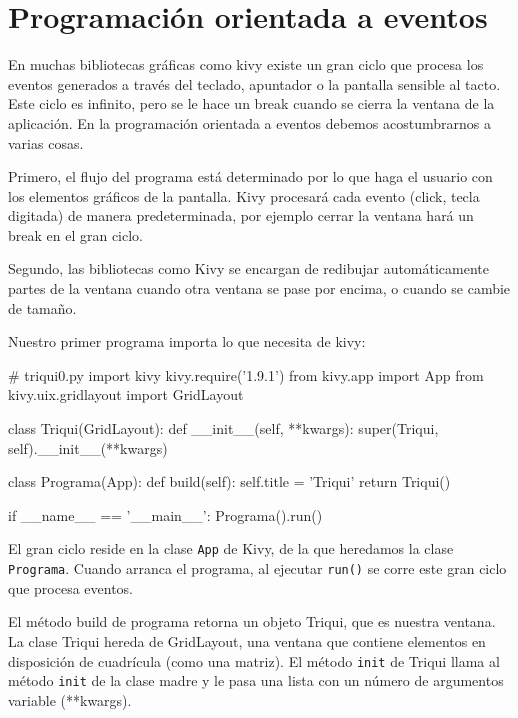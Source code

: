 
\section{Programación orientada a eventos}


En muchas bibliotecas gráficas como kivy existe un gran ciclo que
procesa los eventos generados a través del teclado, apuntador o la
pantalla sensible al tacto. Este ciclo es infinito, pero se le hace
un break cuando se cierra la ventana de la aplicación. En la programación
orientada a eventos debemos acostumbrarnos a varias cosas.

Primero, el flujo del programa está determinado por lo que haga el
usuario con los elementos gráficos de la pantalla. Kivy procesará
cada evento (click, tecla digitada) de manera predeterminada, por
ejemplo cerrar la ventana hará un break en el gran ciclo.


Segundo, las bibliotecas como Kivy se encargan de redibujar automáticamente
partes de la ventana cuando otra ventana se pase por encima, o cuando
se cambie de tamaño.

Nuestro primer programa importa lo que necesita de kivy:

\begin{pythoncode}
# triqui0.py
import kivy
kivy.require('1.9.1')
from kivy.app import App
from kivy.uix.gridlayout import GridLayout

class Triqui(GridLayout):
    def __init__(self, **kwargs):
        super(Triqui, self).__init__(**kwargs)
   

class Programa(App):
    def build(self):
        self.title = 'Triqui'
        return Triqui()

if __name__ == '__main__':
    Programa().run()
\end{pythoncode}

El gran ciclo reside en la clase \texttt{App} de Kivy, de la que heredamos
la clase \texttt{Programa}. Cuando arranca el programa, al ejecutar
\texttt{run()} se corre este gran ciclo que procesa eventos.

El método build de programa retorna un objeto Triqui, que es nuestra
ventana. La clase Triqui hereda de GridLayout, una ventana que contiene
elementos en disposición de cuadrícula (como una matriz). El método
\texttt{init} de Triqui llama al método \texttt{init} de la clase
madre y le pasa una lista con un número de argumentos variable ({*}{*}kwargs).

